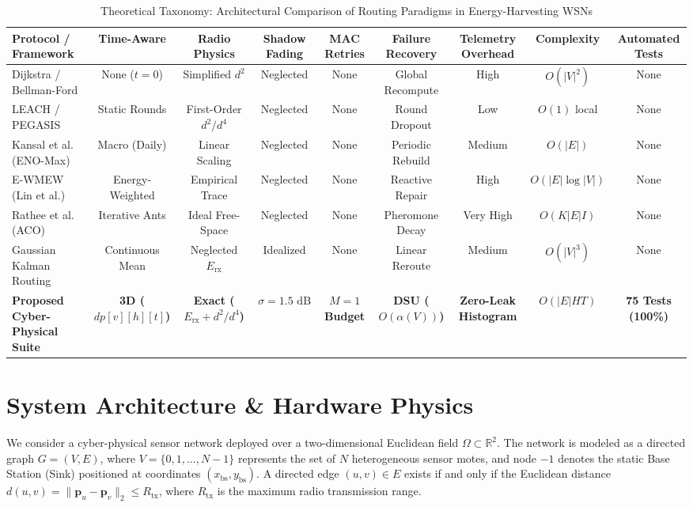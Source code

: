 \documentclass[journal]{IEEEtran}
\begin{document}
\begin{table}[t]
\centering
\caption{Theoretical Taxonomy: Architectural Comparison of Routing Paradigms in Energy-Harvesting WSNs}
\label{tab:taxonomy}
\begin{tabular}{lcccccccc}
\toprule
\textbf{Protocol / Framework} & \textbf{Time-Aware} & \textbf{Radio Physics} & \textbf{Shadow Fading} & \textbf{MAC Retries} & \textbf{Failure Recovery} & \textbf{Telemetry Overhead} & \textbf{Complexity} & \textbf{Automated Tests} \\
\midrule
Dijkstra / Bellman-Ford \cite{chang2004maximum} & None ($t=0$) & Simplified $d^2$ & Neglected & None & Global Recompute & High & $O(|V|^2)$ & None \\
LEACH / PEGASIS \cite{heinzelman2000energy, lindsey2002pegasis} & Static Rounds & First-Order $d^2/d^4$ & Neglected & None & Round Dropout & Low & $O(1)$ local & None \\
Kansal et al. (ENO-Max) \cite{kansal2007power} & Macro (Daily) & Linear Scaling & Neglected & None & Periodic Rebuild & Medium & $O(|E|)$ & None \\
E-WMEW (Lin et al.) \cite{lin2007energy} & Energy-Weighted & Empirical Trace & Neglected & None & Reactive Repair & High & $O(|E|\log|V|)$ & None \\
Rathee et al. (ACO) \cite{rathee2021ant} & Iterative Ants & Ideal Free-Space & Neglected & None & Pheromone Decay & Very High & $O(K|E|I)$ & None \\
Gaussian Kalman Routing \cite{vigorito2007adaptive} & Continuous Mean & Neglected $E_{\text{rx}}$ & Idealized & None & Linear Reroute & Medium & $O(|V|^3)$ & None \\
\midrule
\textbf{Proposed Cyber-Physical Suite} & \textbf{3D ($dp[v][h][t]$)} & \textbf{Exact ($E_{\text{rx}} + d^2/d^4$)} & \textbf{$\sigma = 1.5\text{ dB}$} & \textbf{$M = 1$ Budget} & \textbf{DSU ($O(\alpha(V))$)} & \textbf{Zero-Leak Histogram} & \textbf{$O(|E|HT)$} & \textbf{75 Tests (100\%)} \\
\bottomrule
\end{tabular}
\end{table}

\section{System Architecture \& Hardware Physics}
We consider a cyber-physical sensor network deployed over a two-dimensional Euclidean field $\Omega \subset \mathbb{R}^2$. The network is modeled as a directed graph $G = (V, E)$, where $V = \{0, 1, \dots, N-1\}$ represents the set of $N$ heterogeneous sensor motes, and node $-1$ denotes the static Base Station (Sink) positioned at coordinates $(x_{\text{bs}}, y_{\text{bs}})$. A directed edge $(u, v) \in E$ exists if and only if the Euclidean distance $d(u, v) = \| \mathbf{p}_u - \mathbf{p}_v \|_2 \le R_{\text{tx}}$, where $R_{\text{tx}}$ is the maximum radio transmission range.
\end{document}

